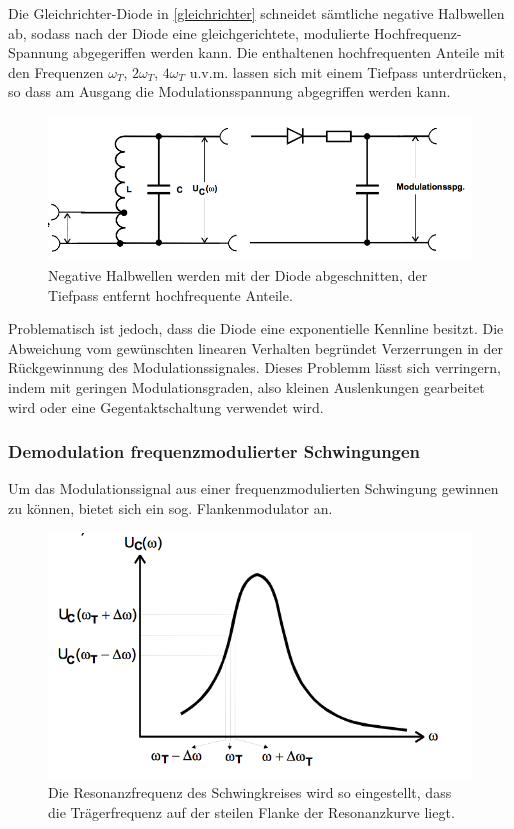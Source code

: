 Die Gleichrichter-Diode in \autoref{gleichrichter} schneidet sämtliche negative Halbwellen ab, sodass nach der Diode eine gleichgerichtete, modulierte Hochfrequenz-Spannung abgegeriffen werden kann. Die enthaltenen hochfrequenten Anteile mit den Frequenzen $\omega_T$, $2\omega_T$,
$4\omega_T$ u.v.m. lassen sich mit einem Tiefpass unterdrücken, so dass am Ausgang die Modulationsspannung abgegriffen werden kann.

\begin{figure}
	\centering
	\includegraphics[width=\textwidth]{img/Abb12.png}
	\caption{Negative Halbwellen werden mit der Diode abgeschnitten, der Tiefpass entfernt hochfrequente Anteile. \cite{FP}}
	\label{gleichrichter}
\end{figure}

Problematisch ist jedoch, dass die Diode eine exponentielle Kennline besitzt. Die Abweichung vom gewünschten linearen Verhalten begründet Verzerrungen in der Rückgewinnung des Modulationssignales. Dieses Problemm lässt sich verringern, indem mit geringen Modulationsgraden, also kleinen Auslenkungen gearbeitet wird oder eine Gegentaktschaltung verwendet wird.

\subsubsection{Demodulation frequenzmodulierter Schwingungen}
Um das Modulationssignal aus einer frequenzmodulierten Schwingung gewinnen zu können, bietet sich ein sog. Flankenmodulator an.

\begin{figure}
	\centering
	\includegraphics[width=\textwidth]{img/Abb13.png}
	\caption{Die Resonanzfrequenz des Schwingkreises wird so eingestellt, dass die Trägerfrequenz auf der steilen Flanke der Resonanzkurve liegt. \cite{FP}}
	\label{resonanzkurve}
\end{figure}

